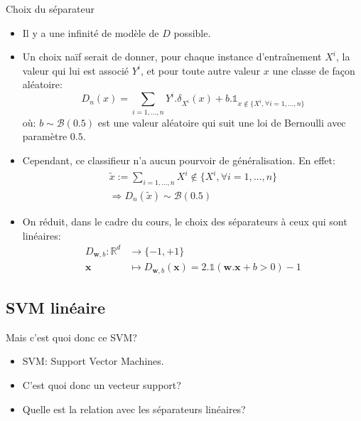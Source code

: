 \documentclass[8pt]{beamer}
\begin{document}
		\begin{frame}{Choix du séparateur}
			\begin{itemize}
				\item  Il y a une infinité de modèle de $D$ possible.
				\item  Un choix naïf serait de donner, pour chaque instance d'entraînement $X^i$, la valeur qui lui est associé $Y^i$, et pour toute autre valeur $x$ une classe de façon aléatoire:
				\begin{equation*}
					D_n(x) = \sum_{i=1,\dots,n} Y^i . \delta_{X^i}(x) + b . \mathbb{1}_{x \notin \{X^i, \forall i=1,\dots,n\}}
				\end{equation*}
				où: $b \sim \mathscr{B}(0.5)$ est une valeur aléatoire qui suit une loi de Bernoulli avec paramètre $0.5$.
				\item Cependant, ce classifieur n'a aucun pourvoir de généralisation. En effet:
				\begin{gather*}
					\widetilde{x} := \sum_{i=1,\dots,n} X^i \notin \{X^i, \forall i=1,\dots,n\} \\
					\Rightarrow D_n(\widetilde{x}) \sim \mathscr{B}(0.5)
				\end{gather*}
				\item  On réduit, dans le cadre du cours, le choix des séparateurs à ceux qui sont linéaires:
				\begin{align*}
					D_{\textbf{w}, b}: \mathbb{R}^d &\rightarrow \{-1, +1\} \\
					\textbf{x} &\mapsto D_{\textbf{w}, b}(\textbf{x}) = 2.\mathbb{1}(\textbf{w}.\textbf{x} + b > 0) - 1
				\end{align*}
			\end{itemize}
		\end{frame}

	\subsection[linear]{SVM linéaire}
		\begin{frame}{Mais c'est quoi donc ce SVM?}
			\begin{itemize}
				\item  SVM\@: Support Vector Machines.
				\item  C'est quoi donc un vecteur support?
				\item  Quelle est la relation avec les séparateurs linéaires?
			\end{itemize}
		\end{frame}
\end{document}
